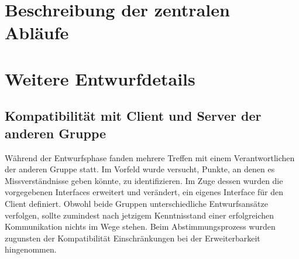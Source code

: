 \documentclass[a4paper,10pt]{article}
\begin{document}
\section{Beschreibung der zentralen Abläufe}
\section{Weitere Entwurfdetails}
\subsection{Kompatibilität mit Client und Server der anderen Gruppe}
Während der Entwurfsphase fanden mehrere Treffen mit einem Verantwortlichen der anderen Gruppe statt. Im Vorfeld wurde versucht, Punkte, an denen es Missverständnisse geben könnte, zu identifizieren. Im Zuge dessen wurden die vorgegebenen Interfaces erweitert und verändert, ein eigenes Interface für den Client definiert. Obwohl beide Gruppen unterschiedliche Entwurfsansätze verfolgen, sollte zumindest nach jetzigem Kenntnisstand einer erfolgreichen Kommunikation nichts im Wege stehen. Beim Abstimmungsprozess wurden zugunsten der Kompatibilität Einschränkungen bei der Erweiterbarkeit hingenommen.
\end{document}
